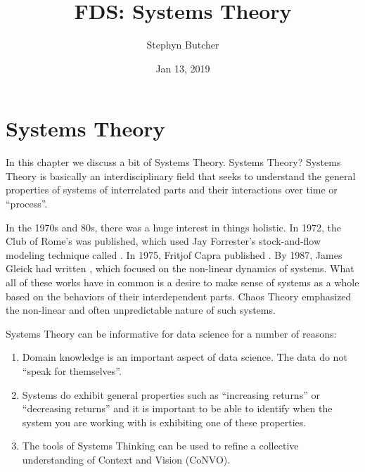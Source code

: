\documentclass[letterpaper,10pt,english]{sphinxmanual}
\title{FDS: Systems Theory}
\date{Jan 13, 2019}
\author{Stephyn Butcher}
\begin{document}
\pagestyle{empty}
\sphinxmaketitle
\pagestyle{plain}
\sphinxtableofcontents
\pagestyle{normal}
\label{\detokenize{title::doc}}



\chapter{Systems Theory}
\label{\detokenize{index:Systems-Theory}}\label{\detokenize{index::doc}}
In this chapter we discuss a bit of Systems Theory. Systems Theory? Systems Theory is basically an interdisciplinary field that seeks to understand the general properties of systems of interrelated parts and their interactions over time or “process”.

In the 1970s and 80s, there was a huge interest in things holistic. In 1972, the Club of Rome’s  was published, which used Jay Forrester’s stock-and-flow modeling technique called . In 1975, Fritjof Capra published . By 1987, James Gleick had written , which focused on the non-linear dynamics of systems. What all of these works have in common is a desire to make sense of systems as a whole based on the behaviors of their interdependent parts. Chaos Theory emphasized the non-linear and often unpredictable nature of such systems.


Systems Theory can be informative for data science for a number of reasons:
\begin{enumerate}
\def\theenumi{\arabic{enumi}}
\def\labelenumi{\theenumi .}
\makeatletter\def\p@enumii{\p@enumi \theenumi .}\makeatother
\item {} 
Domain knowledge is an important aspect of data science. The data do not “speak for themselves”.

\item {} 
Systems do exhibit general properties such as “increasing returns” or “decreasing returns” and it is important to be able to identify when the system you are working with is exhibiting one of these properties.

\item {} 
The tools of Systems Thinking can be used to refine a collective understanding of Context and Vision (CoNVO).

\end{enumerate}
\end{document}
